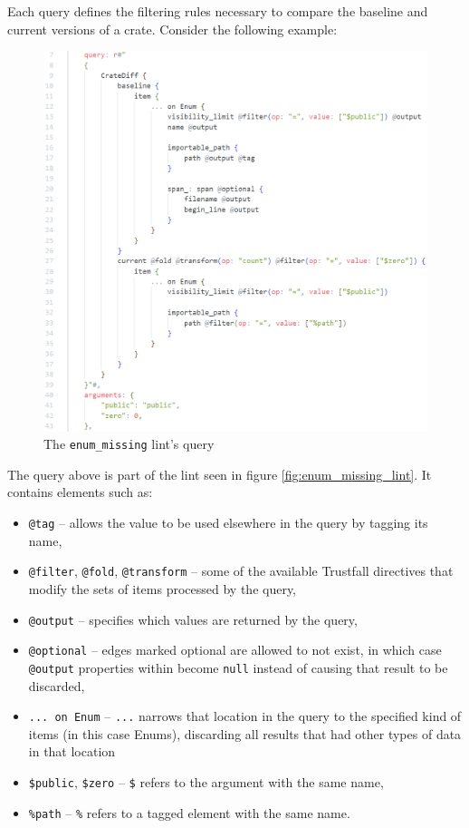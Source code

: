 \documentclass[licencjacka,en]{pracamgr}
\begin{document}
Each query defines the filtering rules necessary to compare the baseline and current versions of
a crate. Consider the following example:
\begin{figure}[h]
	\centering
	\includegraphics[width=\linewidth]{lint-query-example.png}
	\caption{The \texttt{enum\_missing} lint's query}
	\label{fig:enum_missing_lint_query}
\end{figure}
The query above is part of the lint seen in figure \ref{fig:enum_missing_lint}. It contains
elements such as:
\begin{itemize}
	\item \texttt{@tag} -- allows the value to be used elsewhere in the query by
		tagging its name,
	\item \texttt{@filter}, \texttt{@fold}, \texttt{@transform} -- some of the available Trustfall
		directives that modify the sets of items processed by the query,
	\item \texttt{@output} -- specifies which values are returned by the query,
	\item \texttt{@optional} -- edges marked optional are allowed to not exist, in which case \texttt{@output}
		properties within become \texttt{null} instead of causing that result to be discarded,
	\item \texttt{... on Enum} -- \texttt{...} narrows that location in the query to the specified kind of items
		(in this case Enums), discarding all results that had other types of data in that location
	\item \texttt{\$public}, \texttt{\$zero} -- \texttt{\$} refers to the argument with the same
		name,
	\item \texttt{\%path} -- \texttt{\%} refers to a tagged element with the same name.
\end{itemize}
\end{document}

